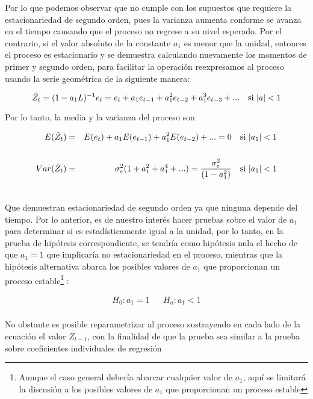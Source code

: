 Por lo que podemos observar que no cumple con los supuestos que requiere la estacionariedad de segundo orden, pues la varianza aumenta conforme se avanza en el tiempo causando que el proceso no regrese a su nivel esperado. Por el contrario, si el valor absoluto de la constante $a_1$ es menor que la unidad, entonces el proceso es estacionario y se demuestra calculando nuevamente los momentos de primer y segundo orden, para facilitar la operación reexpresamos al proceso usando la serie geométrica de la siguiente manera:

\begin{equation}\label{eq:AR_MA}
\tilde{Z}_t=(1-a_1L)^{-1}e_t=e_t+a_1e_{t-1}+a_1^2e_{t-2}+ a_1^3e_{t-3}+... \quad \text{si $\lvert a\rvert<1$}
\end{equation} 

Por lo tanto, la media y la varianza del proceso son

 \begin{eqnarray}
 E(\tilde{Z}_t) &  =&  E(e_t) + a_1E(e_{t-1})+ a_1^2E(e_{t-2})+...= 0 \quad \text{si $\lvert a_1\rvert<1$} \nonumber  \\ 
         &  &    \\
         Var(\tilde{Z}_t) & =& \sigma^2_e (1+a_1^2+ a_1^4+ ...)= \frac{\sigma_e^2}{(1-a_1^2)}  \quad \text{si $\lvert a_1\rvert<1$} \nonumber \\
 & &  \nonumber 
\end{eqnarray}

Que demuestran estacionariedad de segundo orden ya que ninguna depende del tiempo. Por lo anterior, es de nuestro interés hacer pruebas sobre el valor de $a_1$ para determinar si es estadísticamente igual a la unidad, por lo tanto, en la prueba de hipótesis correspondiente, se tendría como hipótesis nula el hecho de que $a_1=1$ que implicaría no estacionariedad en el proceso, mientras que la hipótesis alternativa abarca los posibles valores de $a_1$ que proporcionan un proceso estable\footnote{Aunque el caso general debería abarcar cualquier valor de $a_1$, aquí se limitará la discusión a los posibles valores de $a_1$ que proporcionan un proceso estable} :

   \begin{eqnarray}
    H_0: a_1=1 &  &  H_a: a_1 <1   \\ 
    \nonumber 
   \end{eqnarray} 

No obstante es posible reparametrizar al proceso sustrayendo en cada lado de la ecuación el valor $Z_{t-1}$, con la finalidad de que la prueba sea similar a la prueba sobre coeficientes individuales de regresión


